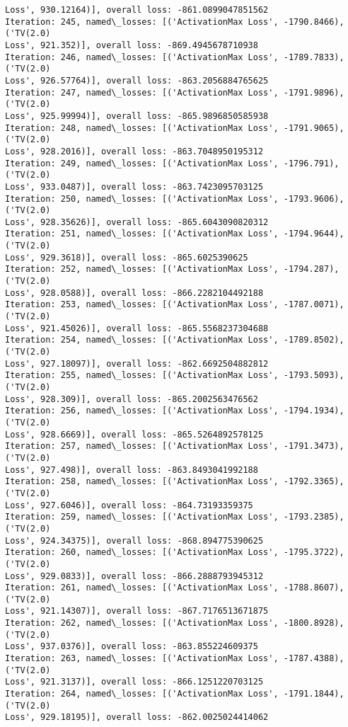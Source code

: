 \documentclass[10pt]{article}
\begin{document}
\begin{Verbatim}[commandchars=\\\{\}]
Loss', 930.12164)], overall loss: -861.0899047851562
Iteration: 245, named\_losses: [('ActivationMax Loss', -1790.8466), ('TV(2.0)
Loss', 921.352)], overall loss: -869.4945678710938
Iteration: 246, named\_losses: [('ActivationMax Loss', -1789.7833), ('TV(2.0)
Loss', 926.57764)], overall loss: -863.2056884765625
Iteration: 247, named\_losses: [('ActivationMax Loss', -1791.9896), ('TV(2.0)
Loss', 925.99994)], overall loss: -865.9896850585938
Iteration: 248, named\_losses: [('ActivationMax Loss', -1791.9065), ('TV(2.0)
Loss', 928.2016)], overall loss: -863.7048950195312
Iteration: 249, named\_losses: [('ActivationMax Loss', -1796.791), ('TV(2.0)
Loss', 933.0487)], overall loss: -863.7423095703125
Iteration: 250, named\_losses: [('ActivationMax Loss', -1793.9606), ('TV(2.0)
Loss', 928.35626)], overall loss: -865.6043090820312
Iteration: 251, named\_losses: [('ActivationMax Loss', -1794.9644), ('TV(2.0)
Loss', 929.3618)], overall loss: -865.6025390625
Iteration: 252, named\_losses: [('ActivationMax Loss', -1794.287), ('TV(2.0)
Loss', 928.0588)], overall loss: -866.2282104492188
Iteration: 253, named\_losses: [('ActivationMax Loss', -1787.0071), ('TV(2.0)
Loss', 921.45026)], overall loss: -865.5568237304688
Iteration: 254, named\_losses: [('ActivationMax Loss', -1789.8502), ('TV(2.0)
Loss', 927.18097)], overall loss: -862.6692504882812
Iteration: 255, named\_losses: [('ActivationMax Loss', -1793.5093), ('TV(2.0)
Loss', 928.309)], overall loss: -865.2002563476562
Iteration: 256, named\_losses: [('ActivationMax Loss', -1794.1934), ('TV(2.0)
Loss', 928.6669)], overall loss: -865.5264892578125
Iteration: 257, named\_losses: [('ActivationMax Loss', -1791.3473), ('TV(2.0)
Loss', 927.498)], overall loss: -863.8493041992188
Iteration: 258, named\_losses: [('ActivationMax Loss', -1792.3365), ('TV(2.0)
Loss', 927.6046)], overall loss: -864.73193359375
Iteration: 259, named\_losses: [('ActivationMax Loss', -1793.2385), ('TV(2.0)
Loss', 924.34375)], overall loss: -868.894775390625
Iteration: 260, named\_losses: [('ActivationMax Loss', -1795.3722), ('TV(2.0)
Loss', 929.0833)], overall loss: -866.2888793945312
Iteration: 261, named\_losses: [('ActivationMax Loss', -1788.8607), ('TV(2.0)
Loss', 921.14307)], overall loss: -867.7176513671875
Iteration: 262, named\_losses: [('ActivationMax Loss', -1800.8928), ('TV(2.0)
Loss', 937.0376)], overall loss: -863.855224609375
Iteration: 263, named\_losses: [('ActivationMax Loss', -1787.4388), ('TV(2.0)
Loss', 921.3137)], overall loss: -866.1251220703125
Iteration: 264, named\_losses: [('ActivationMax Loss', -1791.1844), ('TV(2.0)
Loss', 929.18195)], overall loss: -862.0025024414062

\end{Verbatim}
\end{document}

